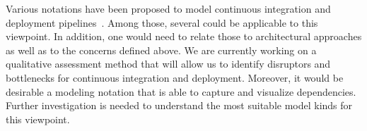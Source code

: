 Various notations have been proposed to model continuous integration and deployment pipelines~\cite{SB2014}. %
Among those, several could be applicable to this viewpoint.
In addition, one would need to relate those to architectural approaches as well as to the concerns defined above. 
We are currently working on a qualitative assessment method that will allow us to identify disruptors and bottlenecks for continuous integration and deployment. %
Moreover, it would be desirable a modeling notation that is able to capture and visualize dependencies.  Further investigation is needed to understand the most suitable model kinds for this viewpoint.







